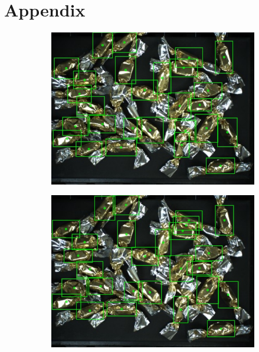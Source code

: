 \chapter*{Appendix}\label{appendix}
\begin{figure}[ht]

  \begin{subfigure}{0.5\textwidth}
    \centering
    \includegraphics[width=0.92\linewidth]{Sources/Figures/appendix/actual_62.jpg}

  \end{subfigure}
  \begin{subfigure}{0.5\textwidth}
    \centering
    \includegraphics[width=0.92\linewidth]{Sources/Figures/appendix/pred_62.jpg}


\end{subfigure}
\end{figure}
